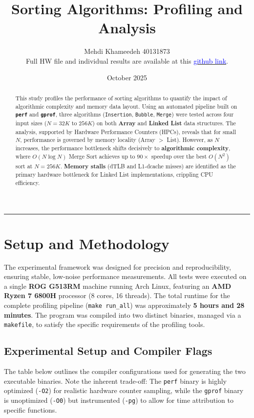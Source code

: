 \documentclass[11pt, a4paper]{article}
\title{Sorting Algorithms: Profiling and Analysis}
\author{Mehdi Khameedeh 40131873\\Full HW file and individual results are available at this \href{https://github.com/Khameedeh/GPU-programming-Fall2025/tree/main/homeworks/homework-1/problem-1}{\textcolor{blue}{github link}}.
}
\date{October 2025}
\begin{document}
\maketitle

\vspace{0.5cm}

\begin{abstract}
This study profiles the performance of sorting algorithms to quantify the impact of algorithmic complexity and memory data layout. Using an automated pipeline built on \textbf{\texttt{perf}} and \textbf{\texttt{gprof}}, three algorithms (\texttt{Insertion}, \texttt{Bubble}, \texttt{Merge}) were tested across four input sizes ($N=32K$ to $256K$) on both \textbf{Array} and \textbf{Linked List} data structures. The analysis, supported by Hardware Performance Counters (HPCs), reveals that for small $N$, performance is governed by memory locality (Array $>$ List). However, as $N$ increases, the performance bottleneck shifts decisively to \textbf{algorithmic complexity}, where $O(N \log N)$ Merge Sort achieves up to $90\times$ speedup over the best $O(N^2)$ sort at $N=256K$. \textbf{Memory stalls} (dTLB and L1-dcache misses) are identified as the primary hardware bottleneck for Linked List implementations, crippling CPU efficiency.
\end{abstract}

\hrule
\vspace{0.3cm}

\section{Setup and Methodology}

The experimental framework was designed for precision and reproducibility, ensuring stable, low-noise performance measurements. All tests were executed on a single \textbf{ROG G513RM} machine running Arch Linux, featuring an \textbf{AMD Ryzen 7 6800H} processor (8 cores, 16 threads). The total runtime for the complete profiling pipeline (\texttt{make run\_all}) was approximately \textbf{5 hours and 28 minutes}. The program was compiled into two distinct binaries, managed via a \texttt{makefile}, to satisfy the specific requirements of the profiling tools.

\subsection{Experimental Setup and Compiler Flags}
The table below outlines the compiler configurations used for generating the two executable binaries. Note the inherent trade-off: The \texttt{perf} binary is highly optimized (\texttt{-O2}) for realistic hardware counter sampling, while the \texttt{gprof} binary is unoptimized (\texttt{-O0}) but instrumented (\texttt{-pg}) to allow for time attribution to specific functions.
\end{document}

